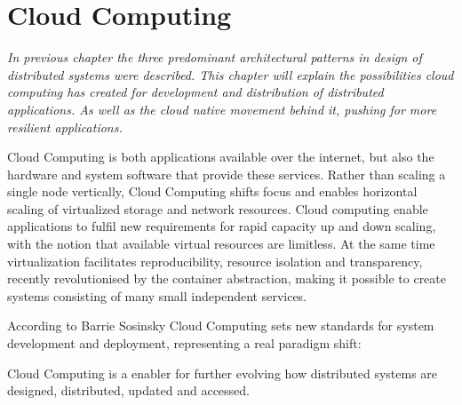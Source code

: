 \chapter{Cloud Computing}
\label{ch:cloud_computing}

\textit{In previous chapter the three predominant architectural patterns in design of distributed systems were described. This chapter will explain the possibilities cloud computing has created for development and distribution of distributed applications. As well as the cloud native movement behind it, pushing for more resilient applications.}

Cloud Computing is both applications available over the internet, but also the hardware and system software that provide these services.
Rather than scaling a single node vertically, Cloud Computing shifts focus and enables horizontal scaling of virtualized storage and network resources\cite{armbrust2010view}. Cloud computing enable applications to fulfil new requirements for rapid capacity up and down scaling, with the notion that available virtual resources are limitless\cite{sosinsky2010cloud}. At the same time virtualization facilitates reproducibility, resource isolation and transparency, recently revolutionised by the container abstraction, making it possible to create systems consisting of many small independent services. 

According to Barrie Sosinsky\cite[p. 3 ]{sosinsky2010cloud} Cloud Computing sets new standards for system development and deployment, representing a real paradigm shift:


Cloud Computing is a enabler for further evolving how distributed systems are designed, distributed, updated and accessed. 




